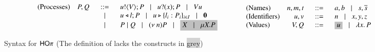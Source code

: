 \begin{figure}[t!]
\[
	\begin{array}{lcl}
		\begin{array}{lrcl}
			\textrm{(Processes)}&
			P, Q	&\bnfis&	\bout{u}{V} P \bnfbar \binp{u}{x} P \bnfbar \appl{V}{u} \\
			&	&\bnfbar&	\bsel{u}{l} P \bnfbar \bbra{u}{l_i: P_i}_{i \in I} \bnfbar \inact\\
			&	&\bnfbar&	P \Par Q \bnfbar \news{n} P \bnfbar \nonhosyntax{\varp{X} \bnfbar  \recp{X}{P}}
		\end{array}
		&\quad &
		\begin{array}{lrcl}
			
			\textrm{(Names)}	& n, m, t	&\bnfis&	a, b \bnfbar s, \dual{s} \\
			\textrm{(Identifiers)}	& u, v		&\bnfis& 	n \bnfbar x, y, z \\
			\textrm{(Values)}	& V, Q		&\bnfis&	\nonhosyntax{u} \bnfbar \abs{x}{P}
		\end{array}
	\end{array}
\]
	\caption{Syntax for $\mathsf{HO}\pi$ (The definition of \HO lacks the constructs in \colorbox{lightgray}{grey}) \label{fig:syntax}}
\end{figure}

